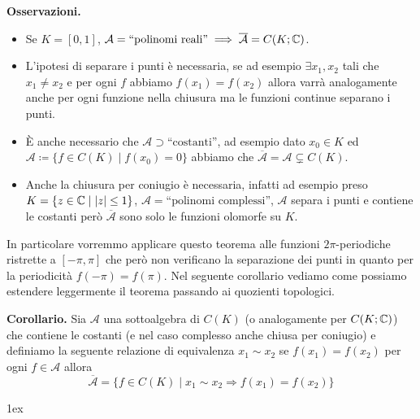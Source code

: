 \begin{enumerate}
\begin{itemize}
		\end{itemize}

		\textbf{Osservazioni.}
		\begin{itemize}
			\item Se $K = [0, 1]$, $\mathcal A = \text{``polinomi reali''} \implies \overline{\mathcal A} = C(K; \mathbb C)$.
			
			\item L'ipotesi di separare i punti è necessaria, se ad esempio $\exists x_1, x_2$ tali che $x_1 \neq x_2$ e per ogni $f$ abbiamo $f(x_1) = f(x_2)$ allora varrà analogamente anche per ogni funzione nella chiusura ma le funzioni continue separano i punti.

			\item È anche necessario che $\mathcal A \supset \text{``costanti''}$, ad esempio dato $x_0 \in K$ ed $\mathcal A \coloneqq \{ f \in C(K) \mid f(x_0) = 0 \}$ abbiamo che $\overline{\mathcal A} = \mathcal A \subsetneq C(K)$.

			\item Anche la chiusura per coniugio è necessaria, infatti ad esempio preso $K = \{ z \in \mathbb C \mid |z| \leq 1 \}$, $\mathcal A = \text{``polinomi complessi''}$, $\mathcal A$ separa i punti e contiene le costanti però $\overline{\mathcal A}$ sono solo le funzioni olomorfe su $K$.
		\end{itemize}

		In particolare vorremmo applicare questo teorema alle funzioni $2\pi$-periodiche ristrette a $[-\pi, \pi]$ che però non verificano la separazione dei punti in quanto per la periodicità $f(-\pi) = f(\pi)$. Nel seguente corollario vediamo come possiamo estendere leggermente il teorema passando ai quozienti topologici.

		\textbf{Corollario.}
		Sia $\mathcal A$ una sottoalgebra di $C(K)$ (o analogamente per $C(K; \mathbb C)$) che contiene le costanti (e nel caso complesso anche chiusa per coniugio) e definiamo la seguente relazione di equivalenza $x_1 \sim x_2$ se $f(x_1) = f(x_2)$ per ogni $f \in \mathcal A$ allora 
		$$
		\overline{\mathcal A} = \{ f \in C(K) \mid x_1 \sim x_2 \Rightarrow f(x_1) = f(x_2) \}
		$$
		\begin{minipage}{\textwidth - 2.5em}
		\parskip 1ex
		\setlength{\parindent}{0pt}

		\begin{wrapfigure}{r}{100pt}
			\centering
			\vspace{-1.5\baselineskip}
			\vspace{-1.5\baselineskip}
		\end{wrapfigure}
		

\end{minipage}
\end{enumerate}
